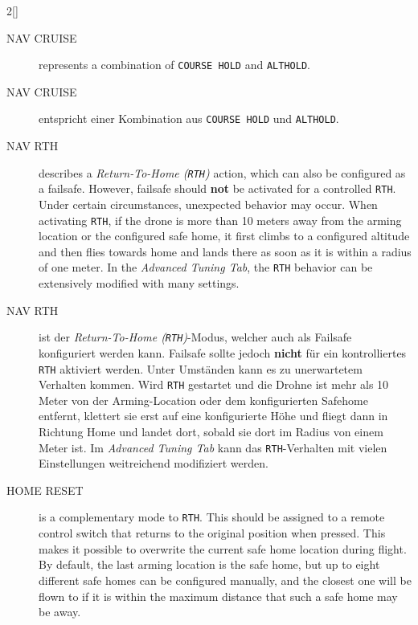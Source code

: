 \begin{paracol}{2}[]
\coleng

\begin{description}
	\item[NAV CRUISE] represents a combination of \texttt{COURSE HOLD} and \texttt{ALTHOLD}.
\end{description}

\colger

\begin{description}
	\item[NAV CRUISE] entspricht einer Kombination aus \texttt{COURSE HOLD} und \texttt{ALTHOLD}.
\end{description}

\coleng

\begin{description}
	\item[NAV RTH] describes a \textsl{Return-To-Home (\texttt{RTH})} action, which can also be configured as a failsafe. However, failsafe should \textbf{not} be activated for a controlled \texttt{RTH}. Under certain circumstances, unexpected behavior may occur. When activating \texttt{RTH}, if the drone is more than 10 meters away from the arming location or the configured safe home, it first climbs to a configured altitude and then flies towards home and lands there as soon as it is within a radius of one meter. In the \textsl{Advanced Tuning Tab}, the \texttt{RTH} behavior can be extensively modified with many settings.	
\end{description}

\colger

\begin{description}
	\item[NAV RTH] ist der \textsl{Return-To-Home (\texttt{RTH})}-Modus, welcher auch als Failsafe konfiguriert werden kann. Failsafe sollte jedoch \textbf{nicht} für ein kontrolliertes \texttt{RTH} aktiviert werden. Unter Umständen kann es zu unerwartetem Verhalten kommen. Wird \texttt{RTH} gestartet und die Drohne ist mehr als 10 Meter von der Arming-Location oder dem konfigurierten Safehome entfernt, klettert sie erst auf eine konfigurierte Höhe und fliegt dann in Richtung Home und landet dort, sobald sie dort im Radius von einem Meter ist. Im \textsl{Advanced Tuning Tab} kann das \texttt{RTH}-Verhalten mit vielen Einstellungen weitreichend modifiziert werden.
\end{description}

\coleng

\begin{description}
	\item[HOME RESET] is a complementary mode to \texttt{RTH}. This should be assigned to a remote control switch that returns to the original position when pressed. This makes it possible to overwrite the current safe home location during flight. By default, the last arming location is the safe home, but up to eight different safe homes can be configured manually, and the closest one will be flown to if it is within the maximum distance that such a safe home may be away.
\end{description}


\end{paracol}
